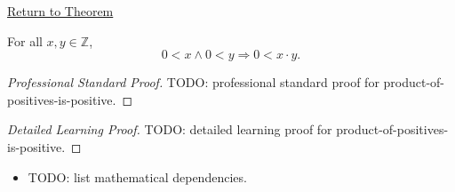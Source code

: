\newpage
{}
\label{prf:product-of-positives-is-positive}

\begin{remark*}[Return]
\hyperref[prop:product-of-positives-is-positive]{Return to Theorem}
\end{remark*}

\begin{proposition*}
For all $x,y\in\mathbb{Z}$,
\[
0<x\land 0<y \Longrightarrow 0<x\cdot y.
\]
\end{proposition*}

\begin{proof}[Professional Standard Proof]
\LRAProofBodyStart
TODO: professional standard proof for product-of-positives-is-positive.
\end{proof}

\begin{proof}[Detailed Learning Proof]
\LRAProofBodyStart
TODO: detailed learning proof for product-of-positives-is-positive.
\end{proof}

\begin{remark*}
\end{remark*}

\begin{dependencies}
\begin{itemize}
  \item TODO: list mathematical dependencies.
\end{itemize}
\end{dependencies}

\clearpage
